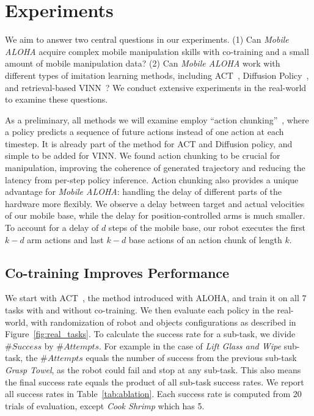\documentclass[11pt, a4paper, logo, twocolumn]{stanford}
\newcommand{\method}{\textit{Mobile ALOHA} }
\newcommand{\methodcomma}{\textit{Mobile ALOHA}}
\begin{document}
\section{Experiments}

We aim to answer two central questions in our experiments. (1) Can \method acquire complex mobile manipulation skills with co-training and a small amount of mobile manipulation data? (2) Can \method work with different types of imitation learning methods, including ACT~\cite{zhao2023learning}, Diffusion Policy~\cite{chi2023diffusionpolicy}, and retrieval-based VINN~\cite{pari2021surprising}?
We conduct extensive experiments in the real-world to examine these questions.

As a preliminary, all methods we will examine employ ``action chunking''~\cite{zhao2023learning}, where a policy predicts a sequence of future actions instead of one action at each timestep. It is already part of the method for ACT and Diffusion policy, and simple to be added for VINN.
We found action chunking to be crucial for manipulation, improving the coherence of generated trajectory and reducing the latency from per-step policy inference. Action chunking also provides a unique advantage for \methodcomma: handling the delay of different parts of the hardware more flexibly. We observe a delay between target and actual velocities of our mobile base, while the delay for position-controlled arms is much smaller. To account for a delay of $d$ steps of the mobile base, our robot executes the first $k - d$ arm actions and last $k - d$ base actions of an action chunk of length $k$.

\subsection{Co-training Improves Performance}
We start with ACT~\cite{zhao2023learning}, the method introduced with ALOHA, and train it on all 7 tasks with and without co-training. We then evaluate each policy in the real-world, with randomization of robot and objects configurations as described in Figure~\ref{fig:real_tasks}. 
To calculate the success rate for a sub-task, we divide $\# Success$ by $\# Attempts$. 
For example in the case of \textit{Lift Glass and Wipe} sub-task, the $\# Attempts$ equals the number of success from the previous sub-task \textit{Grasp Towel}, as the robot could fail and stop at any sub-task. 
This also means the final success rate equals the product of all sub-task success rates.
We report all success rates in Table~\ref{tab:ablation}. Each success rate is computed from 20 trials of evaluation, except \textit{Cook Shrimp} which has 5.
\end{document}
